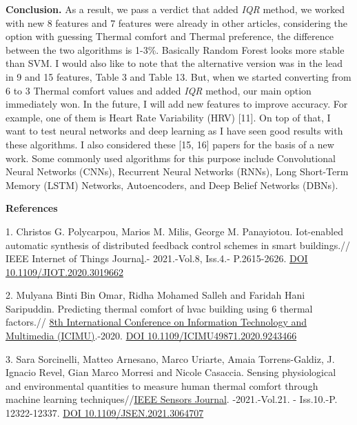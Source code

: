 \begin{multicols}{2}
{\bfseries Conclusion.} As a result, we pass a verdict that added
\emph{IQR} method, we worked with new 8 features and 7 features were
already in other articles, considering the option with guessing Thermal
comfort and Thermal preference, the difference between the two
algorithms is 1-3\%. Basically Random Forest looks more stable than SVM.
I would also like to note that the alternative version was in the lead
in 9 and 15 features, Table 3 and Table 13. But, when we started
converting from 6 to 3 Thermal comfort values and added \emph{IQR}
method, our main option immediately won. In the future, I will add new
features to improve accuracy. For example, one of them is Heart Rate
Variability (HRV) {[}11{]}. On top of that, I want to test neural
networks and deep learning as I have seen good results with these
algorithms. I also considered these {[}15, 16{]} papers for the basis of
a new work. Some commonly used algorithms for this purpose include
Convolutional Neural Networks (CNNs), Recurrent Neural Networks (RNNs),
Long Short-Term Memory (LSTM) Networks, Autoencoders, and Deep Belief
Networks (DBNs).
\end{multicols}

\begin{center}
{\bfseries References}
\end{center}

1. Christos G. Polycarpou, Marios M. Milis, George M. Panayiotou.
Iot-enabled automatic synthesis of distributed feedback control schemes
in smart buildings.// IEEE Internet of Things
Journa\href{https://ieeexplore.ieee.org/xpl/RecentIssue.jsp?punumber=6488907}{l}.-
2021.-Vol.8, Iss.4.- P.2615-2626.
\href{https://doi.org/10.1109/JIOT.2020.3019662}{DOI
10.1109/JIOT.2020.3019662}

2. Mulyana Binti Bin Omar, Ridha Mohamed Salleh and Faridah Hani
Saripuddin. Predicting thermal comfort of hvac building using 6 thermal
factors.//
\href{https://ieeexplore.ieee.org/xpl/conhome/9243083/proceeding}{8th
International Conference on Information Technology and Multimedia
(ICIMU)}.-2020.
\href{https://doi.org/10.1109/ICIMU49871.2020.9243466}{DOI
10.1109/ICIMU49871.2020.9243466}

3. Sara Sorcinelli, Matteo Arnesano, Marco Uriarte, Amaia
Torrens-Galdiz, J. Ignacio Revel, Gian Marco Morresi and Nicole
Casaccia. Sensing physiological and environmental quantities to measure
human thermal comfort through machine learning
techniques//\href{https://ieeexplore.ieee.org/xpl/RecentIssue.jsp?punumber=7361}{IEEE
Sensors Journal}. -2021.-Vol.21. - Iss.10.-P. 12322-12337.
\href{https://doi.org/10.1109/JSEN.2021.3064707}{DOI
10.1109/JSEN.2021.3064707}

